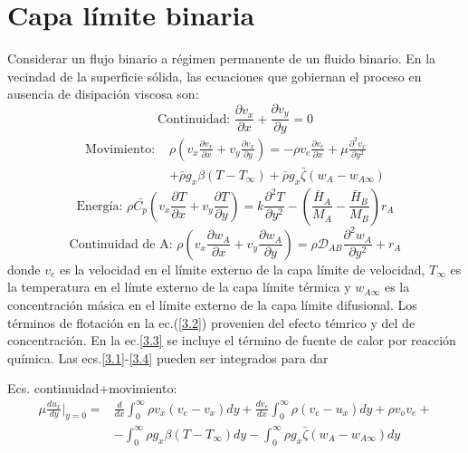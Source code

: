 \section{Capa límite binaria}
Considerar un flujo binario a régimen permanente de un fluido binario. En la vecindad de la superficie sólida, las ecuaciones que gobiernan el proceso en ausencia de disipación viscosa son:
 \begin{equation}
\text{Continuidad: }\frac{\partial v_x}{\partial x} + \frac{\partial v_y}{\partial y} = 0 \label{3.1}
\end{equation}
\begin{equation}
    \begin{split}
    \text{Movimiento: } &\rho \left( v_x \frac{\partial v_x}{\partial x} + v_y \frac{\partial v_x}{\partial y} \right) =- \rho v_e \frac{\partial v_e}{\partial x} + \mu \frac{\partial^2 v_x}{\partial y^2} \\
    & + \bar{\rho} g_x \beta (T - T_{\infty}) + \bar{\rho} g_x \bar{\zeta} (w_A - w_{A\infty})
    \end{split}
    \label{3.2}
\end{equation}
\begin{equation}
    \text{Energía: } \rho \bar{C_p} \left( v_x \frac{\partial T}{\partial x} + v_y \frac{\partial T}{\partial y} \right) = 
    k \frac{\partial^2 T}{\partial y^2} - \left( \frac{\bar{H}_A}{M_A} - \frac{\bar{H}_B}{M_B} \right) r_A
    \label{3.3}
\end{equation}
\begin{equation}
    \text{Continuidad de A: } \rho \left( v_x \frac{\partial w_A}{\partial x} + v_y \frac{\partial w_A}{\partial y} \right) = 
    \rho \mathscr{D}_{AB}  \frac{\partial^2 w_A}{\partial y^2} + r_A 
    \label{3.4}
\end{equation}
donde $v_e$ es la velocidad en el límite externo de la capa límite de velocidad, $T_{\infty}$ es la temperatura en el límte externo de la capa límite térmica y $w_{A\infty}$ es la concentración másica en el límite externo de la capa límite difusional.
Los términos de flotación en la ec.(\eqref{3.2}) provenien del efecto témrico y del de concentración. En la ec.\eqref{3.3} se incluye el término de fuente de calor por reacción química. Las ecs.\eqref{3.1}-\eqref{3.4} pueden ser integrados para dar

Ecs. continuidad+movimiento:
\begin{equation}
    \begin{split}
    \mu \frac{du_x}{dy} \bigg|_{y=0} = &\frac{d}{dx} \int_{0}^{\infty} \rho v_x (v_e - v_x) dy + \frac{d v_e}{dx} \int_{0}^{\infty} \rho (v_e - u_x) dy + \rho v_o v_e + \\
   &- \int_{0}^{\infty} \rho g_x \beta (T - T_{\infty}) dy  - \int_{0}^{\infty} \rho g_x \bar{\zeta} (w_A - w_{A\infty}) dy
    \label{3.5}
\end{split}
\end{equation}

